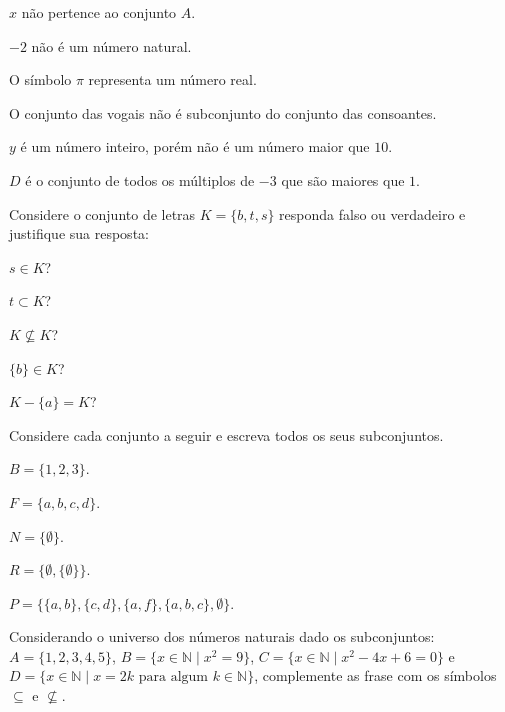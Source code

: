 \begin{exerList}
	\item $x$ não pertence ao conjunto $A$.
	\item $-2$ não é um número natural.
	\item O símbolo $\pi$ representa um número real.
	\item O conjunto das vogais não é subconjunto do conjunto das consoantes. 
	\item $y$ é um número inteiro, porém não é um número maior que $10$.
	\item $D$ é o conjunto de todos os múltiplos de $-3$ que são maiores que $1$.
\end{exerList}

\begin{problem}\label{prob:Conjuntos4}
	Considere o conjunto de letras $K = \{b, t, s\}$ responda falso ou verdadeiro e justifique sua resposta:
\end{problem}

\begin{exerList}
	\item $s \in K$?
	\item $t \subset K$?
	\item $K \not\subseteq K$?
	\item $\{b\} \in K$?
	\item $K - \{a\} = K$?
\end{exerList}

\begin{problem}\label{prob:Conjuntos5}
	Considere cada conjunto a seguir e escreva todos os seus subconjuntos.
\end{problem}

\begin{exerList}
	\item $B = \{1, 2, 3\}$.
	\item $F = \{a, b, c, d\}$.
	\item $N = \{\emptyset\}$.
	\item $R = \{\emptyset, \{\emptyset\}\}$.
	\item $P = \{\{a, b\}, \{c, d\}, \{a, f\}, \{a, b, c\}, \emptyset\}$.
\end{exerList}

\begin{problem}\label{prob:Conjuntos6}
	Considerando o universo dos números naturais dado os subconjuntos:  $A = \{1, 2, 3, 4, 5\}$, $B = \{x \in \mathbb{N} \mid x^2 = 9\}$, $C = \{x \in \mathbb{N} \mid x^2 - 4x + 6 = 0\}$ e $D = \{x \in \mathbb{N} \mid  x = 2k \mbox{ para algum } k \in \mathbb{N}\}$, complemente as frase com os símbolos $\subseteq$ e $\not\subseteq$.
\end{problem}

